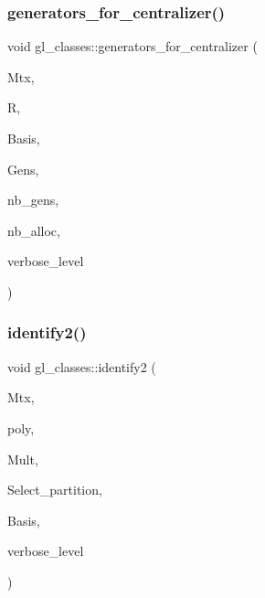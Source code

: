 \subsubsection{\texorpdfstring{generators\+\_\+for\+\_\+centralizer()}{generators\_for\_centralizer()}}
{\footnotesize\ttfamily void gl\+\_\+classes\+::generators\+\_\+for\+\_\+centralizer (\begin{DoxyParamCaption}\item[{\mbox{\hyperlink{galois_8h_a09fddde158a3a20bd2dcadb609de11dc}{I\+NT}} $\ast$}]{Mtx,  }\item[{\mbox{\hyperlink{classgl__class__rep}{gl\+\_\+class\+\_\+rep}} $\ast$}]{R,  }\item[{\mbox{\hyperlink{galois_8h_a09fddde158a3a20bd2dcadb609de11dc}{I\+NT}} $\ast$}]{Basis,  }\item[{\mbox{\hyperlink{galois_8h_a09fddde158a3a20bd2dcadb609de11dc}{I\+NT}} $\ast$$\ast$\&}]{Gens,  }\item[{\mbox{\hyperlink{galois_8h_a09fddde158a3a20bd2dcadb609de11dc}{I\+NT}} \&}]{nb\+\_\+gens,  }\item[{\mbox{\hyperlink{galois_8h_a09fddde158a3a20bd2dcadb609de11dc}{I\+NT}} \&}]{nb\+\_\+alloc,  }\item[{\mbox{\hyperlink{galois_8h_a09fddde158a3a20bd2dcadb609de11dc}{I\+NT}}}]{verbose\+\_\+level }\end{DoxyParamCaption})}

\mbox{\label{classgl__classes_a01f63c38f74a678752344f31fc3820bc}} 
\subsubsection{\texorpdfstring{identify2()}{identify2()}}
{\footnotesize\ttfamily void gl\+\_\+classes\+::identify2 (\begin{DoxyParamCaption}\item[{\mbox{\hyperlink{galois_8h_a09fddde158a3a20bd2dcadb609de11dc}{I\+NT}} $\ast$}]{Mtx,  }\item[{\mbox{\hyperlink{galois_8h_a77ca58de3d2da6172242493dd9c8aaa8}{unipoly\+\_\+object}} \&}]{poly,  }\item[{\mbox{\hyperlink{galois_8h_a09fddde158a3a20bd2dcadb609de11dc}{I\+NT}} $\ast$}]{Mult,  }\item[{\mbox{\hyperlink{galois_8h_a09fddde158a3a20bd2dcadb609de11dc}{I\+NT}} $\ast$}]{Select\+\_\+partition,  }\item[{\mbox{\hyperlink{galois_8h_a09fddde158a3a20bd2dcadb609de11dc}{I\+NT}} $\ast$}]{Basis,  }\item[{\mbox{\hyperlink{galois_8h_a09fddde158a3a20bd2dcadb609de11dc}{I\+NT}}}]{verbose\+\_\+level }\end{DoxyParamCaption})}

